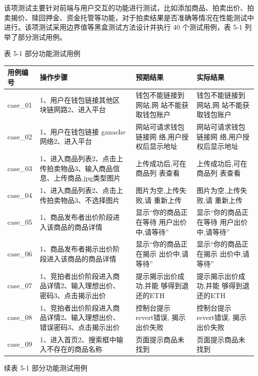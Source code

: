 \documentclass[
  10
]{article}
\newcounter{none} %
\begin{document}
该项测试主要针对前端与用户交互的功能进行测试，比如添加商品、拍卖出价、拍卖揭价、赎回押金、资金托管等功能，对于拍卖结果是否准确等情况在性能测试中进行。该项测试采用边界值等黑盒测试方法设计并执行
40 个测试用例，表 5-1 列举了部分测试用例。

表 5-1 部分功能测试用例

{\def\LTcaptype{none} %
\begin{longtable}[]{@{}|l|l|l|l|@{}}
\toprule\noalign{}
\endhead
\bottomrule\noalign{}
\endlastfoot
\hline
用例编号 & 操作步骤 & 预期结果 & 实际结果 \\
\hline
case\_01 & 1、用户在钱包链接其他区 块链网路2、进入平台 &
钱包不能链接到网站,网 站不能获取钱包账户 & 钱包不能链接到网站,网
站不能获取钱包账户 \\
\hline
case\_02 & 1、用户在钱包链接 ganache 网络2、进入平台 &
网站可请求钱包链接网 络,用户授权后显示地址 & 网站可请求钱包链接网
络,用户授权后显示地址 \\
\hline
case\_03 & 1、进入商品列表2、点击上 传拍卖物品3、输入商品信
息、上传商品.jpg类型图片 & 上传成功后,可在商品列 表查看 &
上传成功后,可在商品列 表查看 \\
\hline
case\_04 & 1、进入商品列表2、点击上 传拍卖物品3、不选择图片 &
图片为空,上传失败,请 重新上传 & 图片为空,上传失败,请 重新上传 \\
\hline
case\_05 & 1、商品发布者出价阶段进 入该商品的商品详情 &
显示``你的商品正在等待 用户出价中,请等待'' & 显示``你的商品正在等待
用户出价中,请等待'' \\
\hline
case\_06 & 1、商品发布者揭示出价阶 段进入该商品的商品详情 &
显示``你的商品正在揭示 出价中,请等待'' & 显示``你的商品正在揭示
出价中,请等待'' \\
\hline
case\_07 & 1、竞拍者出价阶段进入商 品详情2、输入理想出价、
密码3、点击揭示出价 & 提示揭示出价成功,并能 够得到退还的ETH &
提示揭示出价成功,并能 够得到退还的ETH \\
\hline
case\_08 & 1、竞拍者出价阶段进入商 品详情2、输入理想出价、
错误密码3、点击揭示出价 & 控制台提示 revert错误, 揭示出价失败 &
控制台提示 revert错误, 揭示出价失败 \\
\hline
case\_09 & 1、进入首页2、搜索框中输 入不存在的商品名称 &
页面提示商品未找到 & 页面提示商品未找到 \\
\hline
\end{longtable}
}

续表 5-1 部分功能测试用例
\end{document}
